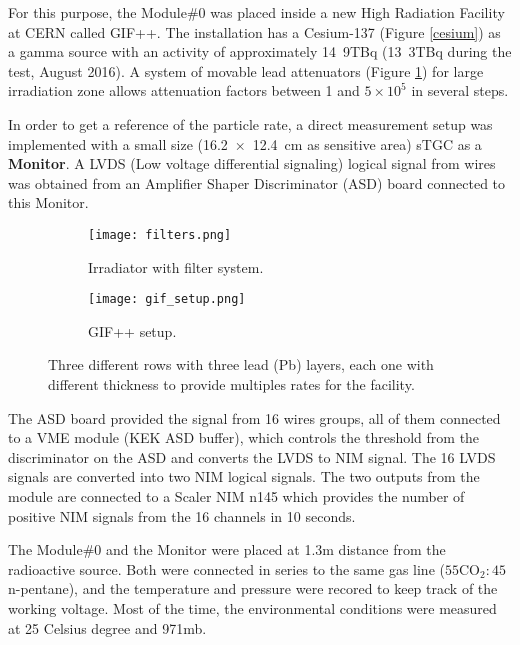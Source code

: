 For this purpose, the Module\#0 was
placed inside a new High Radiation Facility at CERN called GIF++\cite{gif}.
The installation has a Cesium-137 (Figure \ref{cesium}) as a gamma source with an activity of approximately
\unit{14.9}{TBq} (\unit{13.3}{TBq} during the test, August 2016). 
A system of movable lead attenuators (Figure \ref{filters}) for large irradiation zone allows attenuation factors
between 1 and $5\times10^5$
in several steps.\par 

In order to get a reference of the particle rate, a direct measurement setup was implemented with a  small size
(\SI{16,2x12,4}{cm} as sensitive area) sTGC as a {\bf Monitor}. A LVDS (Low voltage differential signaling) logical
signal from wires was obtained from an Amplifier Shaper Discriminator (ASD) board\cite{asdchip} connected to this
Monitor.\par

\begin{figure}[H]
		\hspace*{\fill}
		\begin{subfigure}[b]{0.25\textwidth}
			\centering
			\texttt{[image: filters.png]}
			\caption{Irradiator with filter system. }\label{filters}
		\end{subfigure}
		\hfill
		\begin{subfigure}[b]{0.45\textwidth}
			\centering
			\texttt{[image: gif\_setup.png]}
			\caption{GIF++ setup.}\label{gifsetup}
		\end{subfigure}
		\hspace*{\fill}
		\captionsetup{margin=1cm}
		\caption{Three different rows with
		three lead (Pb) layers, each one with different thickness to provide multiples rates for the facility.}\label{}
\end{figure}

The ASD board provided the signal from 16 wires groups, all of them connected to a VME module (KEK ASD
buffer), which controls the threshold from the discriminator on the ASD and converts the LVDS to NIM signal. The 16
LVDS signals are converted into two NIM logical signals. The two outputs from the module are connected to a Scaler NIM
n145 which provides the number of positive NIM signals from the 16 channels in 10 seconds.\par

The Module\#0 and the Monitor were placed at 1.3m distance from the radioactive source. Both were connected in series
to the same gas line ($\mathrm{55 CO_2 : 45}$ n-pentane), and the temperature and pressure were recored to keep track of the working voltage. Most of the
time, the environmental conditions were measured at 25 Celsius degree and \unit{971}{mb}.\par 

